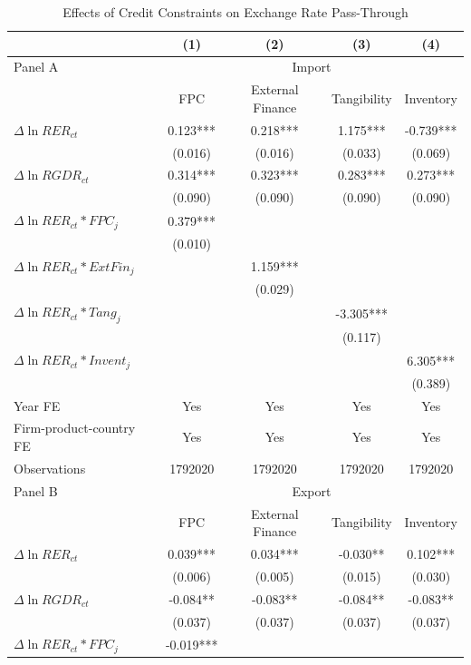\documentclass[12pt]{article}
\begin{document}
\begin{table}[htbp]
	\centering
	\caption{Effects of Credit Constraints on Exchange Rate Pass-Through}
	\begin{threeparttable}	
		\begin{tabular}{lcccc}
			\toprule
			& (1)   & (2)   & (3)   & (4) \\
			\midrule
			Panel A & \multicolumn{4}{c}{Import} \\
			& FPC   & External Finance & Tangibility & Inventory \\
			\midrule
			$\Delta \ln RER_{ct}$ & 0.123*** & 0.218*** & 1.175*** & -0.739*** \\
			& (0.016) & (0.016) & (0.033) & (0.069) \\
			$\Delta \ln RGDR_{ct}$ & 0.314*** & 0.323*** & 0.283*** & 0.273*** \\
			& (0.090) & (0.090) & (0.090) & (0.090) \\
			$\Delta \ln RER_{ct}*FPC_{j}$ & 0.379*** &       &       &  \\
			& (0.010) &       &       &  \\
			$\Delta \ln RER_{ct}*ExtFin_{j}$ &       & 1.159*** &       &  \\
			&       & (0.029) &       &  \\
			$\Delta \ln RER_{ct}*Tang_{j}$ &       &       & -3.305*** &  \\
			&       &       & (0.117) &  \\
			$\Delta \ln RER_{ct}*Invent_{j}$ &       &       &       & 6.305*** \\
			&       &       &       & (0.389) \\
			Year FE  & Yes   & Yes   & Yes   & Yes \\
			Firm-product-country FE & Yes   & Yes   & Yes   & Yes \\
			Observations & 1792020 & 1792020 & 1792020 & 1792020 \\
			\midrule
			Panel B & \multicolumn{4}{c}{Export} \\
			& FPC   & External Finance & Tangibility & Inventory \\
			\midrule
			$\Delta \ln RER_{ct}$ & 0.039*** & 0.034*** & -0.030** & 0.102*** \\
			& (0.006) & (0.005) & (0.015) & (0.030) \\
			$\Delta \ln RGDR_{ct}$ & -0.084** & -0.083** & -0.084** & -0.083** \\
			& (0.037) & (0.037) & (0.037) & (0.037) \\
			$\Delta \ln RER_{ct}*FPC_{j}$ & -0.019*** &       &       &  \\

\end{tabular}
\end{threeparttable}
\end{table}
\end{document}
